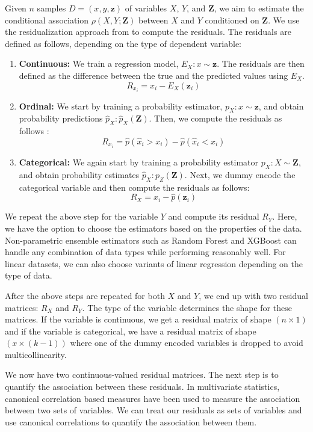 \documentclass{uai2025} %
\begin{document}
Given $ n $ samples $ D = (x, y, \bm{z}) $ of variables $ X $, $ Y $, and $
\bm{Z} $, we aim to estimate the conditional
association $ \rho(X, Y; \bm{Z}) $ between $ X $ and $ Y $ conditioned on $
\bm{Z} $. We use the residualization approach from \citet{Ankan2023} to compute 
the residuals. The residuals are defined as follows, depending on the type of 
dependent variable:

\begin{enumerate}
	\item \textbf{Continuous:} We train a regression model, $ E_X: x \sim
		\bm{z} $. The residuals are then defined as the difference
		between the true and the predicted values using $ E_X $. 
		$$ R_{x_i} = x_i - E_X(\bm{z}_i) $$
	\item \textbf{Ordinal:} We start by training a probability estimator, $
		p_X: x \sim \bm{z} $, and obtain probability predictions 
		$ \hat{p}_X: \hat{p}_X(\bm{Z}) $. Then, we compute the residuals
		as follows \citep{Li2012}:
		$$ R_{x_i} = \hat{p}(\hat{x}_i > x_i) - \hat{p}(\hat{x}_i < x_i) $$
	\item \textbf{Categorical:} We again start by training a probability
		estimator $ p_X: X \sim \bm{Z} $, and obtain probability
		estimates $ \hat{p}_X: p_Z(\bm{Z}) $. Next, we dummy encode the
		categorical variable and then compute the residuals as follows: 
		$$ R_X = x_i - \hat{p}(\bm{z}_i) $$
\end{enumerate}


We repeat the above step for the variable $ Y $ and compute its residual $ R_Y
$. Here, we have the option to choose the estimators based on the properties of
the data. Non-parametric ensemble estimators such as Random Forest and XGBoost
can handle any combination of data types while performing reasonably well. For
linear datasets, we can also choose variants of linear regression depending on
the type of data. 

After the above steps are repeated for both $ X $ and $ Y $, we end up with two
residual matrices: $ R_X $ and $ R_Y $. The type of the variable determines the
shape for these matrices. If the variable is continuous, we get a residual
matrix of shape $ ( n \times 1 ) $ and if the variable is categorical, we have
a residual matrix of shape $ ( x \times (k -1)) $ where one of the dummy encoded
variables is dropped to avoid multicollinearity.

We now have two continuous-valued residual matrices. The next step is
to quantify the association between these residuals. In multivariate
statistics, canonical correlation based measures have been used to measure
the association between two sets of variables. We can treat our residuals
as sets of variables and use canonical correlations to quantify the association
between them.
\end{document}
